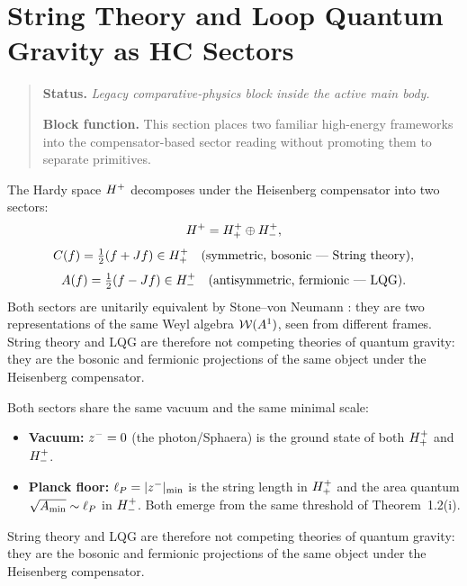\section{String Theory and Loop Quantum Gravity as HC Sectors}
\begin{quote}\small
\noindent\textbf{Status.} \emph{Legacy comparative-physics block inside the active main body.}\par
\noindent\textbf{Block function.} This section places two familiar high-energy frameworks into the compensator-based sector reading without promoting them to separate primitives.
\end{quote}
\label{sec:stringlqg}

\begin{theorem}
\label{thm:string-lqg-duality}
The Hardy space $H^+$ decomposes under the Heisenberg compensator
into two sectors:
\[
  H^+ = H^+_+\oplus H^+_-,
\]
\[
  C(f) = \tfrac{1}{2}(f+Jf)\in H^+_+
  \quad\text{(symmetric, bosonic --- String theory)},
\]
\[
  A(f) = \tfrac{1}{2}(f-Jf)\in H^+_-
  \quad\text{(antisymmetric, fermionic --- LQG)}.
\]
Both sectors are unitarily equivalent by Stone--von Neumann
\cite{brendecke2026rh}: they are two representations of the same
Weyl algebra $\mathcal{W}(A^1)$, seen from different frames.
String theory and LQG are therefore not competing theories of quantum
gravity: they are the bosonic and fermionic projections of the same
object under the Heisenberg compensator.
\end{theorem}

\begin{proposition}
\label{prop:shared-vacuum-planck}
Both sectors share the same vacuum and the same minimal scale:
\begin{itemize}
  \item \textbf{Vacuum:} $z^-=0$ (the photon/Sphaera) is the ground
        state of both $H^+_+$ and $H^+_-$.
  \item \textbf{Planck floor:} $\ell_P=|z^-|_{\min}$ is the string
        length in $H^+_+$ and the area quantum
        $\sqrt{A_{\min}}\sim\ell_P$ in $H^+_-$.
        Both emerge from the same threshold of Theorem~1.2(i).
\end{itemize}
String theory and LQG are therefore not competing theories of quantum
gravity: they are the bosonic and fermionic projections of the same
object under the Heisenberg compensator.
\end{proposition}


